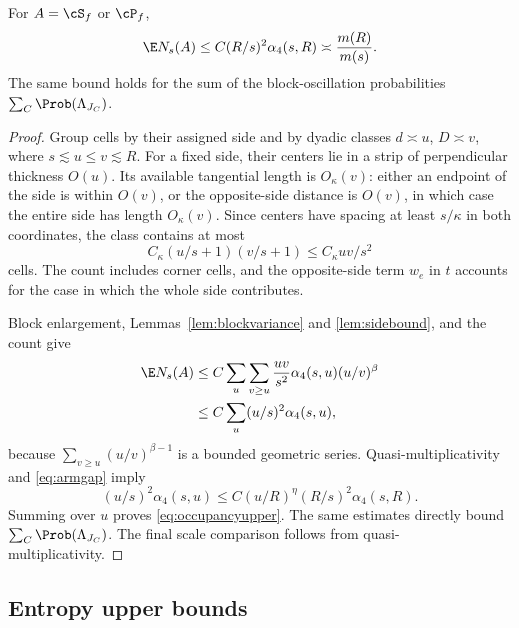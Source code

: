 \begin{proposition}\label{prop:occupancy}
For $A=\cS_f$ or $\cP_f$,
\begin{equation}\label{eq:occupancyupper}
 \E N_s(A)\le C(R/s)^2\alpha_4(s,R)
 \asymp\frac{m(R)}{m(s)}.
\end{equation}
The same bound holds for the sum of the block-oscillation probabilities $\sum_C\Prob(\Lambda_{J_C})$.
\end{proposition}
\begin{proof}
Group cells by their assigned side and by dyadic classes $d\asymp u$, $D\asymp v$, where $s\lesssim u\le v\lesssim R$. For a fixed side, their centers lie in a strip of perpendicular thickness $O(u)$. Its available tangential length is $O_\kappa(v)$: either an endpoint of the side is within $O(v)$, or the opposite-side distance is $O(v)$, in which case the entire side has length $O_\kappa(v)$. Since centers have spacing at least $s/\kappa$ in both coordinates, the class contains at most
\[
 C_\kappa(u/s+1)(v/s+1)\le C_\kappa uv/s^2
\]
cells. The count includes corner cells, and the opposite-side term $w_e$ in $t$ accounts for the case in which the whole side contributes.

Block enlargement, Lemmas~\ref{lem:blockvariance} and \ref{lem:sidebound}, and the count give
\begin{align*}
 \E N_s(A)
 &\le C\sum_u\sum_{v\ge u}\frac{uv}{s^2}\alpha_4(s,u)(u/v)^\beta\\
 &\le C\sum_u(u/s)^2\alpha_4(s,u),
\end{align*}
because $\sum_{v\ge u}(u/v)^{\beta-1}$ is a bounded geometric series. Quasi-multiplicativity and \eqref{eq:armgap} imply
\[
 (u/s)^2\alpha_4(s,u)
 \le C(u/R)^\eta (R/s)^2\alpha_4(s,R).
\]
Summing over $u$ proves \eqref{eq:occupancyupper}. The same estimates directly bound $\sum_C\Prob(\Lambda_{J_C})$. The final scale comparison follows from quasi-multiplicativity.
\end{proof}

\subsection{Entropy upper bounds}

